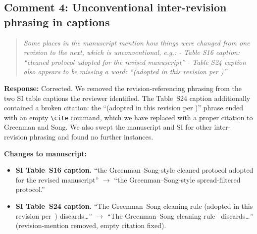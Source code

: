\documentclass[11pt]{article}
\newenvironment{reviewer}{%
  \begin{quote}\itshape\color{black!70}}{%
  \end{quote}}
\newcommand{\response}[1]{\noindent\textbf{Response:} #1\par\medskip}
\newenvironment{changes}{%
  \noindent\textbf{Changes to manuscript:}
  \begin{itemize}[leftmargin=2em,itemsep=2pt]}{%
  \end{itemize}\medskip}
\begin{document}
\subsection*{Comment 4: Unconventional inter-revision phrasing in captions}
\begin{reviewer}
Some places in the manuscript mention how things were changed from one revision to the next, which is unconventional, e.g.:
- Table S16 caption: ``cleaned protocol adopted for the revised manuscript''
- Table S24 caption also appears to be missing a word: ``(adopted in this revision per )''
\end{reviewer}
\response{Corrected. We removed the revision-referencing phrasing from the two SI table captions the reviewer identified. The Table~S24 caption additionally contained a broken citation: the ``(adopted in this revision per )'' phrase ended with an empty \texttt{\textbackslash cite} command, which we have replaced with a proper citation to Greenman and Song. We also swept the manuscript and SI for other inter-revision phrasing and found no further instances.}
\begin{changes}
  \item \textbf{SI Table~S16 caption.} ``the Greenman--Song-style cleaned protocol adopted for the revised manuscript'' $\rightarrow$ ``the Greenman--Song-style spread-filtered protocol.''
  \item \textbf{SI Table~S24 caption.} ``The Greenman--Song cleaning rule (adopted in this revision per~) discards\ldots'' $\rightarrow$ ``The Greenman--Song cleaning rule~\cite{greenman2022multifidelity,song2025fluortools} discards\ldots'' (revision-mention removed, empty citation fixed).
\end{changes}
\end{document}
